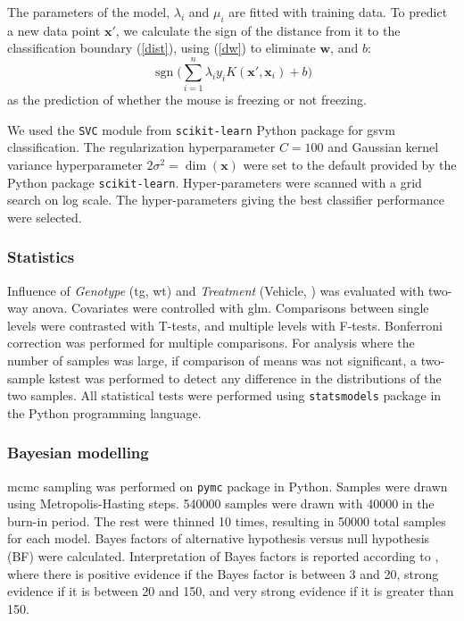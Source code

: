 The parameters of the model, $\lambda_i$ and $\mu_i$ are fitted with training data. To predict a new data point $\mathbf{x}'$, we calculate the sign of the distance from it to the classification boundary (\ref{dist}), using (\ref{dw}) to eliminate $\mathbf{w}$, and $b$:
\begin{equation*}
    \operatorname{sgn}\Big(\sum_{i=1}^n\lambda_iy_iK(\mathbf{x}', \mathbf{x}_i) + b\Big)
\end{equation*}
as the prediction of whether the mouse is freezing or not freezing.

We used the \texttt{SVC} module from \texttt{scikit-learn} Python package for \gls{gsvm} classification. The regularization hyperparameter $C=100$ and Gaussian kernel variance hyperparameter $2\sigma^2=\operatorname{dim}(\mathbf{x})$ were set to the default provided by the Python package \texttt{scikit-learn}. Hyper-parameters were scanned with a grid search on log scale. The hyper-parameters giving the best classifier performance were selected. 



\subsubsection{Statistics}

Influence of \textit{Genotype} (\gls{tg}, \gls{wt}) and \textit{Treatment} (Vehicle, \tglu{}) was evaluated with two-way \gls{anova}. Covariates were controlled with \gls{glm}. Comparisons between single levels were contrasted with T-tests, and multiple levels with F-tests. Bonferroni correction was performed for multiple comparisons. For analysis where the number of samples was large, if comparison of means was not significant, a two-sample \gls{kstest} was performed to detect any difference in the distributions of the two samples. All statistical tests were performed using \texttt{statsmodels} package in the Python programming language.

\subsubsection{Bayesian modelling}
\Gls{mcmc} sampling was performed on \texttt{pymc} package in Python. Samples were drawn using Metropolis-Hasting steps. \num{540000} samples were drawn with \num{40000} in the burn-in period. The rest were thinned \num{10} times, resulting in \num{50000} total samples for each model. Bayes factors of alternative hypothesis versus null hypothesis (BF) were calculated. Interpretation of Bayes factors is reported according to \citet{kass95}, where there is positive evidence if the Bayes factor is between 3 and 20, strong evidence if it is between 20 and 150, and very strong evidence if it is greater than 150.

